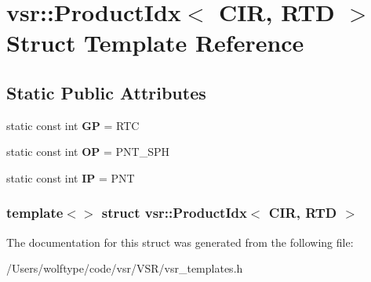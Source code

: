 \hypertarget{structvsr_1_1_product_idx_3_01_c_i_r_00_01_r_t_d_01_4}{\section{vsr\-:\-:Product\-Idx$<$ C\-I\-R, R\-T\-D $>$ Struct Template Reference}
\label{structvsr_1_1_product_idx_3_01_c_i_r_00_01_r_t_d_01_4}
}
\subsection*{Static Public Attributes}
\begin{DoxyCompactItemize}
\item 
\hypertarget{structvsr_1_1_product_idx_3_01_c_i_r_00_01_r_t_d_01_4_a4ad65e680ef72ae2998ea42e4ee63a1c}{static const int {\bfseries G\-P} = R\-T\-C}\label{structvsr_1_1_product_idx_3_01_c_i_r_00_01_r_t_d_01_4_a4ad65e680ef72ae2998ea42e4ee63a1c}

\item 
\hypertarget{structvsr_1_1_product_idx_3_01_c_i_r_00_01_r_t_d_01_4_afa00d24b9439c9d69d94e604f8e93cf2}{static const int {\bfseries O\-P} = P\-N\-T\-\_\-\-S\-P\-H}\label{structvsr_1_1_product_idx_3_01_c_i_r_00_01_r_t_d_01_4_afa00d24b9439c9d69d94e604f8e93cf2}

\item 
\hypertarget{structvsr_1_1_product_idx_3_01_c_i_r_00_01_r_t_d_01_4_a423ddd564798682d6db4eb2b636137f5}{static const int {\bfseries I\-P} = P\-N\-T}\label{structvsr_1_1_product_idx_3_01_c_i_r_00_01_r_t_d_01_4_a423ddd564798682d6db4eb2b636137f5}

\end{DoxyCompactItemize}
\subsubsection*{template$<$$>$ struct vsr\-::\-Product\-Idx$<$ C\-I\-R, R\-T\-D $>$}



The documentation for this struct was generated from the following file\-:\begin{DoxyCompactItemize}
\item 
/\-Users/wolftype/code/vsr/\-V\-S\-R/vsr\-\_\-templates.\-h\end{DoxyCompactItemize}
